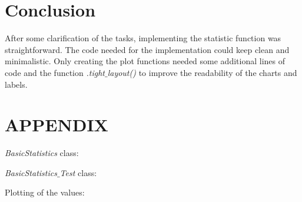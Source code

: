 \documentclass[10pt, a4paper, twocolumn]{article} %
\begin{document}
\section{Conclusion}
After some clarification of the tasks, implementing the statistic function was straightforward. The code needed for the implementation could keep clean and minimalistic. Only creating the plot functions needed some additional lines of code and the function \textit{.tight$\_$layout()} to improve the readability of the charts and labels. 

\section*{APPENDIX}

\textit{BasicStatistics} class: 

\newpage

\textit{BasicStatistics$\_$Test} class: 

\newpage

Plotting of the values:






\printbibliography[title={Bibliography}] %

\end{document}
